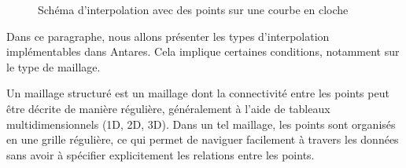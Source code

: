 \begin{figure}[ht!]
    \centering
    \caption{Schéma d'interpolation avec des points sur une courbe en cloche}
    \label{fig:interpolation_cloche_points}
\end{figure}

    
\vspace{0,5cm}

Dans ce paragraphe, nous allons présenter les types d'interpolation\cite{cassiopee2015} implémentables dans Antares.
Cela implique certaines conditions, notamment sur le type de maillage.

Un maillage structuré est un maillage dont la connectivité\label{connectivité} entre les points peut être décrite de manière régulière, généralement à l'aide de tableaux multidimensionnels (1D, 2D, 3D). Dans un tel maillage, les points sont organisés en une grille régulière, ce qui permet de naviguer facilement à travers les données sans avoir à spécifier explicitement les relations entre les points.

